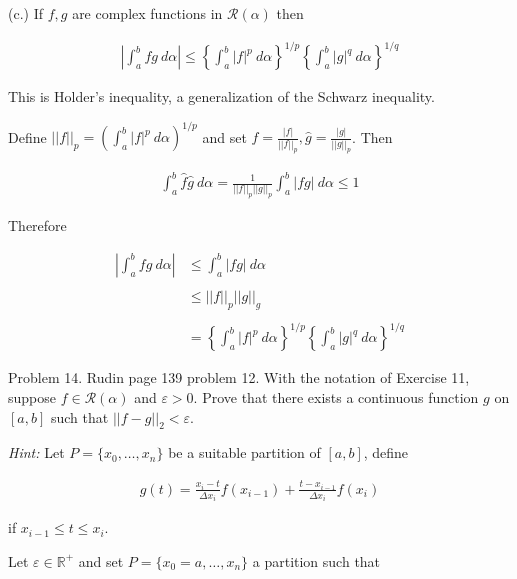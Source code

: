 \documentclass{article}
\begin{document}
  {\Large \color{Sepia} (c.) If $f,g$ are complex functions in $\mathscr R(\alpha)$ then

  \begin{align*}
    \left|\int_a^b fg\ d\alpha\right| \leq \left\{\int_a^b|f|^p\ d\alpha\right\}^{1/p}\left\{\int_a^b|g|^q\ d\alpha\right\}^{1/q}
  \end{align*}

  This is Holder's inequality, a generalization of the Schwarz inequality.
  }

  \vspace{1cm}

  Define $||f||_p=\left(\int_a^b|f|^p\ d\alpha\right)^{1/p}$ and set $\hat f = \frac{|f|}{||f||_p}, \hat g = \frac{|g|}{||g||_p}$.  Then

  \begin{align*}
    \int_a^b \hat f \hat g \ d\alpha = \frac{1}{||f||_p||g||_p}\int_a^b |fg| \ d\alpha \leq 1
  \end{align*}

  Therefore

  \begin{align*}
    \left|\int_a^b f g \ d\alpha \right| &\leq \int_a^b |fg| \ d\alpha \\\\
    &\leq ||f||_p||g||_g \\\\
    &= \left\{\int_a^b|f|^p\ d\alpha\right\}^{1/p}\left\{\int_a^b|g|^q\ d\alpha\right\}^{1/q}
  \end{align*}

  \pagebreak
  {\Large \color{Sepia} Problem 14. Rudin page 139 problem 12. With the notation of Exercise 11, suppose $f\in\mathscr R(\alpha)$ and $\varepsilon >0$.  Prove that there exists a continuous function $g$ on $[a,b]$ such that $||f-g||_2<\varepsilon$.

  {\it Hint:} Let $P=\{x_0,\dots,x_n\}$ be a suitable partition of $[a,b]$, define

  \begin{align*}
    g(t)=\frac{x_i-t}{\Delta x_i}f(x_{i-1})+\frac{t-x_{i-1}}{\Delta x_i}f(x_i)
  \end{align*}

  if $x_{i-1}\leq t \leq x_i$.

  }

  \vspace{1cm}

  Let $\varepsilon\in\mathbb R^+$ and set $P=\{x_0=a,\dots,x_n\}$ a partition such that
\end{document}
